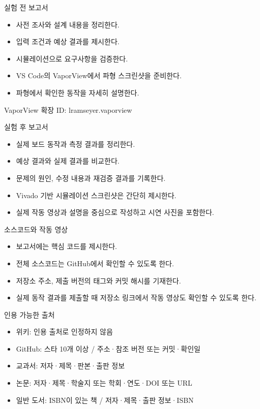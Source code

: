 \documentclass[aspectratio=169,11pt,t]{beamer}
\begin{document}
\begin{frame}{실험 전 보고서}
\begin{itemize}
\item 사전 조사와 설계 내용을 정리한다.
\item 입력 조건과 예상 결과를 제시한다.
\item 시뮬레이션으로 요구사항을 검증한다.
\item VS Code의 VaporView에서 파형 스크린샷을 준비한다.
\item 파형에서 확인한 동작을 자세히 설명한다.
\end{itemize}
\vspace{0.35cm}
VaporView 확장 ID: lramseyer.vaporview
\end{frame}

\begin{frame}{실험 후 보고서}
\begin{itemize}
\item 실제 보드 동작과 측정 결과를 정리한다.
\item 예상 결과와 실제 결과를 비교한다.
\item 문제의 원인, 수정 내용과 재검증 결과를 기록한다.
\item Vivado 기반 시뮬레이션 스크린샷은 간단히 제시한다.
\item 실제 작동 영상과 설명을 중심으로 작성하고 시연 사진을 포함한다.
\end{itemize}
\end{frame}

\begin{frame}{소스코드와 작동 영상}
\begin{itemize}
\item 보고서에는 핵심 코드를 제시한다.
\item 전체 소스코드는 GitHub에서 확인할 수 있도록 한다.
\item 저장소 주소, 제출 버전의 태그와 커밋 해시를 기재한다.
\item 실제 동작 결과를 제출할 때 저장소 링크에서 작동 영상도 확인할 수 있도록 한다.
\end{itemize}
\end{frame}

\begin{frame}{인용 가능한 출처}
\begin{itemize}
\item 위키: 인용 출처로 인정하지 않음
\item GitHub: 스타 10개 이상 / 주소·참조 버전 또는 커밋·확인일
\item 교과서: 저자·제목·판본·출판 정보
\item 논문: 저자·제목·학술지 또는 학회·연도·DOI 또는 URL
\item 일반 도서: ISBN이 있는 책 / 저자·제목·출판 정보·ISBN
\end{itemize}
\end{frame}
\end{document}
